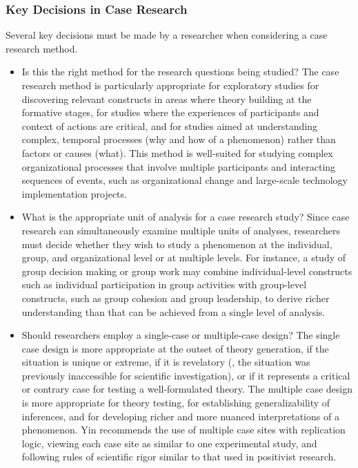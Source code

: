 \subsubsection{Key Decisions in Case Research}

Several key decisions must be made by a researcher when considering a case research method. 

\begin{itemize}
	\item Is this the right method for the research questions being studied? The case research method is particularly appropriate for exploratory studies for discovering relevant constructs in areas where theory building at the formative stages, for studies where the experiences of participants and context of actions are critical, and for studies aimed at understanding complex, temporal processes (why and how of a phenomenon) rather than factors or causes (what). This method is well-suited for studying complex organizational processes that involve multiple participants and interacting sequences of events, such as organizational change and large-scale technology implementation projects.

	\item What is the appropriate unit of analysis for a case research study? Since case research can simultaneously examine multiple units of analyses, researchers must decide whether they wish to study a phenomenon at the individual, group, and organizational level or at multiple levels. For instance, a study of group decision making or group work may combine individual-level constructs such as individual participation in group activities with group-level constructs, such as group cohesion and group leadership, to derive richer understanding than that can be achieved from a single level of analysis.

	\item Should researchers employ a single-case or multiple-case design? The single case design is more appropriate at the outset of theory generation, if the situation is unique or extreme, if it is revelatory (\ie, the situation was previously inaccessible for scientific investigation), or if it represents a critical or contrary case for testing a well-formulated theory. The multiple case design is more appropriate for theory testing, for establishing generalizability of inferences, and for developing richer and more nuanced interpretations of a phenomenon. Yin\cite{yin2017case} recommends the use of multiple case sites with replication logic, viewing each case site as similar to one experimental study, and following rules of scientific rigor similar to that used in positivist research.


\end{itemize}

